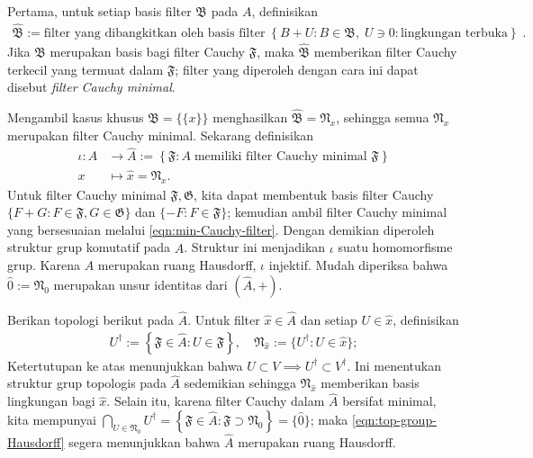 \begin{asparaenum}
	\item Pertama, untuk setiap basis filter $\mathfrak{B}$ pada $A$, definisikan
	\begin{gather}\label{eqn:min-Cauchy-filter}
		\hat{\mathfrak{B}} := \text{filter yang dibangkitkan oleh basis filter}\; \left\{ B+U: B \in \mathfrak{B},\; U \ni 0: \text{lingkungan terbuka} \right\} \;\text{.}
	\end{gather}
	Jika $\mathfrak{B}$ merupakan basis bagi filter Cauchy $\mathfrak{F}$, maka $\hat{\mathfrak{B}}$ memberikan filter Cauchy terkecil yang termuat dalam $\mathfrak{F}$; filter yang diperoleh dengan cara ini dapat disebut \emph{filter Cauchy minimal}.

	\item Mengambil kasus khusus $\mathfrak{B} = \{\{x\}\}$ menghasilkan $\hat{\mathfrak{B}} = \mathfrak{N}_x$, sehingga semua $\mathfrak{N}_x$ merupakan filter Cauchy minimal. Sekarang definisikan
	\begin{align*}
		\iota: A & \longrightarrow \hat{A} := \left\{ \mathfrak{F}: A\; \text{memiliki filter Cauchy minimal }\mathfrak{F} \right\} \\
		x & \longmapsto \hat{x} = \mathfrak{N}_x.
	\end{align*}
	Untuk filter Cauchy minimal $\mathfrak{F}, \mathfrak{G}$, kita dapat membentuk basis filter Cauchy $\{ F+G : F \in \mathfrak{F}, G \in \mathfrak{G} \}$ dan $\{ -F: F \in \mathfrak{F} \}$; kemudian ambil filter Cauchy minimal yang bersesuaian melalui \eqref{eqn:min-Cauchy-filter}. Dengan demikian diperoleh struktur grup komutatif pada $\hat{A}$. Struktur ini menjadikan $\iota$ suatu homomorfisme grup. Karena $A$ merupakan ruang Hausdorff, $\iota$ injektif. Mudah diperiksa bahwa $\hat{0} := \mathfrak{N}_0$ merupakan unsur identitas dari $(\hat{A}, +)$.

	\item Berikan topologi berikut pada $\hat{A}$. Untuk filter $\hat{x} \in \hat{A}$ dan setiap $U \in \hat{x}$, definisikan
	\begin{gather}\label{eqn:filter-dagger}
		U^\dagger := \left\{ \mathfrak{F} \in \hat{A} : U \in \mathfrak{F} \right\}, \quad \mathfrak{N}_{\hat{x}} := \{ U^\dagger: U \in \hat{x} \};
	\end{gather}
	Ketertutupan ke atas menunjukkan bahwa $U \subset V \implies U^\dagger \subset V^\dagger$. Ini menentukan struktur grup topologis pada $\hat{A}$ sedemikian sehingga $\mathfrak{N}_{\hat{x}}$ memberikan basis lingkungan bagi $\hat{x}$. Selain itu, karena filter Cauchy dalam $\hat{A}$ bersifat minimal, kita mempunyai $\bigcap_{U \in \mathfrak{N}_0} U^\dagger = \left\{ \mathfrak{F} \in \hat{A}: \mathfrak{F} \supset \mathfrak{N}_0 \right\} = \{\hat{0}\}$; maka \eqref{eqn:top-group-Hausdorff} segera menunjukkan bahwa $\hat{A}$ merupakan ruang Hausdorff.
	

\end{asparaenum}
